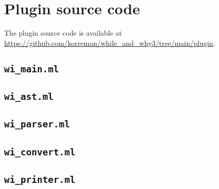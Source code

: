\section{Plugin source code}
The plugin source code is available at\\ \url{https://github.com/korreman/while_and_why3/tree/main/plugin}.
\subsection{\texttt{wi\_main.ml}}

\subsection{\texttt{wi\_ast.ml}}

\subsection{\texttt{wi\_parser.ml}}

\subsection{\texttt{wi\_convert.ml}}

\subsection{\texttt{wi\_printer.ml}}

